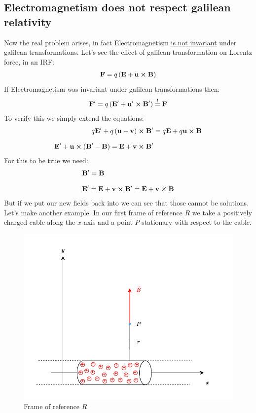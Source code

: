 \subsection{Electromagnetism does not respect galilean relativity}
Now the real problem arises, in fact Electromagnetism \underline{is not invariant} under galilean transformations. Let's see the effect of galilean transformation on Lorentz force, in an IRF:
\begin{equation}
  \vb{F} = q\left(\vb{E} + \vb{u} \cross \vb{B}\right)
\end{equation}
If Electromagnetism was invariant under galilean transformations then:
\begin{equation}
  \vb{F}' = q\left(\vb{E}' + \vb{u}' \cross \vb{B}'\right) \overset{!}{=} \vb{F}
\end{equation}
To verify this we simply extend the equations:
\begin{equation}
  \begin{split}
    q\vb{E}' + q\left(\vb{u}-\vb{v}\right) \cross \vb{B}' &= q\vb{E} + q\vb{u}\cross \vb{B} \\[8pt]
    \vb{E}' + \vb{u} \cross \left(\vb{B}'-\vb{B}\right)  = \vb{E} + \vb{v}\cross \vb{B}'
  \end{split}
\end{equation}
For this to be true we need:
\begin{equation} \label{e:false_conditions}
  \begin{split}
    &\vb{B}' = \vb{B}\\[8pt]
    &\vb{E}' = \vb{E} + \vb{v} \cross \vb{B}' = \vb{E} + \vb{v} \cross \vb{B}
  \end{split}
\end{equation}
But if we put our new fields back into \maxwellref\;we can see that those cannot be solutions.\\
Let's make another example. In our first frame of reference $R$ we take a positively charged cable along the $x$ axis and a point $P$ stationary with respect to the cable.
\begin{figure}[H]
  \centering
  \includegraphics[width=0.6\linewidth]{res/svg/stationary_cable.drawio}
  \caption{Frame of reference $R$}
\end{figure}
